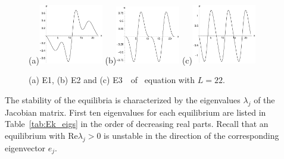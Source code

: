 \begin{figure}[h]\vspace*{-5pt}
\centering
(a)\includegraphics[width=0.25\textwidth]{figs/1wKS22equil.eps}
(b)\includegraphics[width=0.25\textwidth]{figs/2wKS22equil.eps}
(c)\includegraphics[width=0.25\textwidth]{figs/3wKS22equil.eps}
\vspace*{-5pt}\caption{ {\small (a) E1, (b) E2 and (c)
E3~\eqva\ of \KS\ equation with $L=22$.}}
\label{f:KS22Equil}\vspace*{-5pt}
\end{figure}


The stability of the equilibria is characterized by the eigenvalues
$\lambda_j$ of the Jacobian matrix.  First ten eigenvalues for each
equilibrium are listed in Table~\ref{tab:Ek_eigs} in the order of
decreasing real parts. Recall that an equilibrium with $\mathrm{Re}
\lambda_j > 0$ is unstable in the direction of the corresponding
eigenvector $e_j$.

